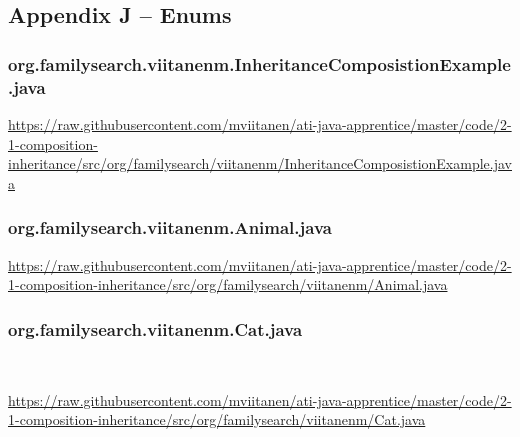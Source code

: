 \subsection*{Appendix J -- Enums} \label{App:AppendixJ}

\subsubsection*{org.familysearch.viitanenm.InheritanceComposistionExample.java}
\noindent
\begin{minipage}{.6in}
\end{minipage}
\begin{minipage}{6in}
  \url{https://raw.githubusercontent.com/mviitanen/ati-java-apprentice/master/code/2-1-composition-inheritance/src/org/familysearch/viitanenm/InheritanceComposistionExample.java}
\end{minipage}

\vspace{1em}
\subsubsection*{org.familysearch.viitanenm.Animal.java}
\noindent
\begin{minipage}{.6in}
\end{minipage}
\begin{minipage}{6in}
  \url{https://raw.githubusercontent.com/mviitanen/ati-java-apprentice/master/code/2-1-composition-inheritance/src/org/familysearch/viitanenm/Animal.java}
\end{minipage}

\vspace{1em}
\subsubsection*{org.familysearch.viitanenm.Cat.java}\
\noindent
\begin{minipage}{.6in}
\end{minipage}
\begin{minipage}{6in}
  \url{https://raw.githubusercontent.com/mviitanen/ati-java-apprentice/master/code/2-1-composition-inheritance/src/org/familysearch/viitanenm/Cat.java}
\end{minipage}

